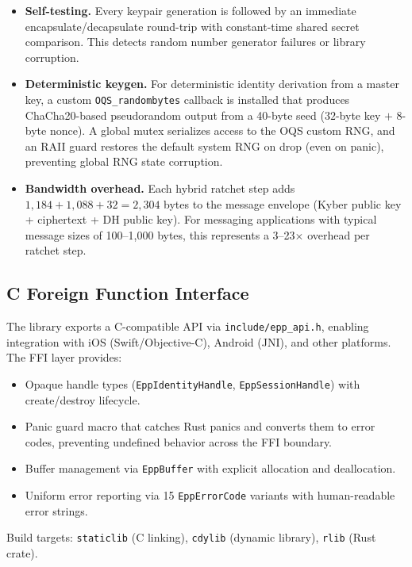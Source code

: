 \documentclass[11pt,a4paper]{article}
\theoremstyle{definition}
\begin{document}
\begin{itemize}
  \item \textbf{Self-testing.} Every keypair generation is followed by an immediate encapsulate/decapsulate round-trip with constant-time shared secret comparison. This detects random number generator failures or library corruption.

  \item \textbf{Deterministic keygen.} For deterministic identity derivation from a master key, a custom \texttt{OQS\_randombytes} callback is installed that produces ChaCha20-based pseudorandom output from a 40-byte seed ($32$-byte key $+$ $8$-byte nonce). A global mutex serializes access to the OQS custom RNG, and an RAII guard restores the default system RNG on drop (even on panic), preventing global RNG state corruption.

  \item \textbf{Bandwidth overhead.} Each hybrid ratchet step adds $1{,}184 + 1{,}088 + 32 = 2{,}304$ bytes to the message envelope (Kyber public key + ciphertext + DH public key). For messaging applications with typical message sizes of 100--1{,}000 bytes, this represents a 3--23$\times$ overhead per ratchet step.
\end{itemize}

\subsection{C Foreign Function Interface}

The library exports a C-compatible API via \texttt{include/epp\_api.h}, enabling integration with iOS (Swift/Objective-C), Android (JNI), and other platforms. The FFI layer provides:

\begin{itemize}
  \item Opaque handle types (\texttt{EppIdentityHandle}, \texttt{EppSessionHandle}) with create/destroy lifecycle.
  \item Panic guard macro that catches Rust panics and converts them to error codes, preventing undefined behavior across the FFI boundary.
  \item Buffer management via \texttt{EppBuffer} with explicit allocation and deallocation.
  \item Uniform error reporting via 15 \texttt{EppErrorCode} variants with human-readable error strings.
\end{itemize}

Build targets: \texttt{staticlib} (C linking), \texttt{cdylib} (dynamic library), \texttt{rlib} (Rust crate).
\end{document}

